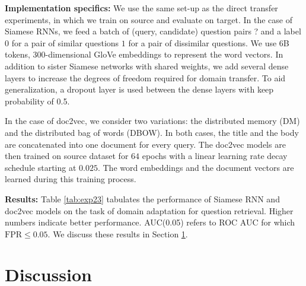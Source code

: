 \documentclass{sigkddExp}
\begin{document}
\textbf{Implementation specifics:} We use the same set-up as the direct transfer experiments, in which we train on \textsf{source} and evaluate on \textsf{target}. In the case of Siamese RNNs, we feed a batch of {\color{red}(query, candidate) question pairs ?} and a label $0$ for a pair of similar questions $1$ for a pair of dissimilar questions. We use 6B tokens, 300-dimensional \textsf{GloVe} embeddings to represent the word vectors. In addition to sister Siamese networks with shared weights, we add several dense layers to increase the degrees of freedom required for domain transfer. To aid generalization, a dropout layer is used between the dense layers with keep probability of 0.5.

In the case of \textsf{doc2vec}, we consider two variations: the distributed memory (DM) and the distributed bag of words (DBOW). In both cases, the title and the body are concatenated into one document for every query. The doc2vec models are then trained on \textsf{source} dataset for $64$ epochs with a linear learning rate decay schedule starting at $0.025$. The word embeddings and the document vectors are learned during this training process.

\textbf{Results:} Table \ref{tab:exp23} tabulates the performance of Siamese RNN and \textsf{doc2vec} models on the task of domain adaptation for question retrieval. Higher numbers indicate better performance. AUC(0.05) refers to ROC AUC for which $\mathrm{FPR} \leq 0.05$. We discuss these results in Section \ref{discussion}.

\section{Discussion}
\label{discussion}
\end{document}
